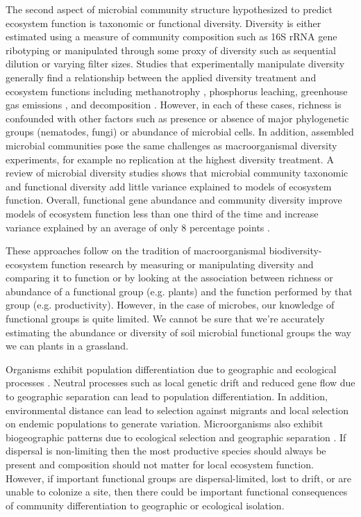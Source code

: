 \documentclass{article}
\begin{document}
The second aspect of microbial community structure hypothesized to predict
ecosystem function is taxonomic or functional
diversity. Diversity is either estimated using a measure of community
composition such as 16S rRNA gene ribotyping or manipulated through some proxy
of diversity such as sequential dilution or varying filter sizes. Studies that
experimentally manipulate diversity generally find a relationship between
the applied diversity treatment and ecosystem functions including methanotrophy
\citep{schnyder2018}, phosphorus leaching, greenhouse gas emissions
\citep{wagg2014}, and decomposition \citep{maron2018}. However, in each of these
cases, richness is confounded with other factors such as presence or absence of
major phylogenetic groups (nematodes, fungi) or abundance of microbial cells. In
addition, assembled microbial communities pose the same challenges as
macroorganismal diversity experiments, for example no replication at the highest
diversity treatment. A review of microbial diversity studies shows that
microbial community taxonomic and functional diversity add little variance
explained to models of ecosystem function. Overall, functional gene
abundance and community diversity improve models of ecosystem function less than
one third of the time and increase variance explained by an average of only 8 percentage
points \citep{graham2016}.

These approaches follow on the tradition of macroorganismal
biodiversity-ecosystem function research by measuring or manipulating diversity
and comparing it to function or by looking at the association between richness
or abundance of a functional group (e.g. plants) and the function performed by
that group (e.g. productivity). However, in the case of microbes, our knowledge
of functional groups is quite limited. We cannot be sure that we're accurately
estimating the abundance or diversity of soil microbial functional groups the
way we can plants in a grassland. 

Organisms exhibit population differentiation due to geographic and ecological
processes \citep{wright1943}. Neutral processes such as local genetic drift and
reduced gene flow due to geographic separation can lead to population
differentiation. In addition, environmental distance can lead to selection
against migrants \citep{hendry2004} and local selection on endemic populations
to generate variation. Microorganisms also exhibit biogeographic patterns due to
ecological selection and geographic separation \citep{martiny2006}. If dispersal
is non-limiting then the most productive species should always be present and
composition should not matter for local ecosystem function. However, if important
functional groups are dispersal-limited, lost to drift, or are unable to
colonize a site, then there could be important functional consequences of
community differentiation to geographic or ecological isolation.
\end{document}
